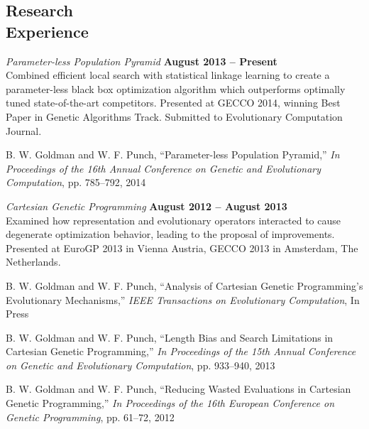 \documentclass[margin,line]{resume}
\begin{document}
\begin{resume}
    \section{\mysidestyle Research\\Experience}
    \textsl{Parameter-less Population Pyramid} \hfill \textbf{August 2013 -- Present}\\
    Combined efficient local search with statistical linkage learning to create a
    parameter-less black box optimization algorithm which outperforms optimally tuned
    state-of-the-art competitors. Presented at GECCO 2014, winning Best Paper in Genetic
    Algorithms Track. Submitted to Evolutionary Computation Journal.
    
    \vspace{-2mm}
    B. W. Goldman and W. F. Punch,
    ``Parameter-less Population Pyramid,''
    \textsl{In Proceedings of the 16th Annual Conference on Genetic and Evolutionary Computation}, pp. 785--792, 2014
        
    \textsl{Cartesian Genetic Programming} \hfill \textbf{August 2012 -- August 2013}\\
    Examined how representation and evolutionary operators interacted to cause degenerate
    optimization behavior, leading to the proposal of improvements.  Presented at EuroGP 2013
    in Vienna Austria, GECCO 2013 in Amsterdam, The Netherlands.
    
    \vspace{-2mm}
    B. W. Goldman and W. F. Punch,
    ``Analysis of Cartesian Genetic Programming's Evolutionary Mechanisms,''
    \textsl{IEEE Transactions on Evolutionary Computation}, In Press
    
    \vspace{-2mm}
    B. W. Goldman and W. F. Punch,
    ``Length Bias and Search Limitations in Cartesian Genetic Programming,''
    \textsl{In Proceedings of the 15th Annual Conference on Genetic and Evolutionary Computation}, pp. 933--940, 2013

    \vspace{-2mm}
    B. W. Goldman and W. F. Punch,
    ``Reducing Wasted Evaluations in  Cartesian Genetic Programming,''
    \textsl{In Proceedings of the 16th European Conference on Genetic Programming}, pp. 61--72, 2012


\end{resume}
\end{document}

